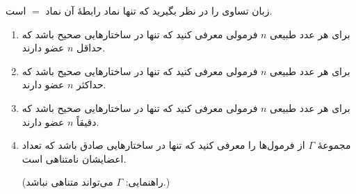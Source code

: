 زبان تساوی را در نظر بگیرید که تنها نماد رابطهٔ آن نماد
$=$
است.
\begin{enumerate}[label=(\alph*)]
    \item برای هر عدد طبیعی 
    $n$
    فرمولی معرفی کنید که تنها در ساختارهایی صحیح باشد که حداقل $n$ عضو دارند.
    \item برای هر عدد طبیعی 
    $n$
    فرمولی معرفی کنید که تنها در ساختارهایی صحیح باشد که حداکثر $n$ عضو دارند.
    \item برای هر عدد طبیعی
    $n$
    فرمولی معرفی کنید که تنها در ساختارهایی صحیح باشد که دقیقاً $n$ عضو دارند.
    \item مجموعهٔ $\Gamma$ از فرمول‌ها را معرفی کنید که تنها در ساختارهایی صادق باشد که تعداد اعضایشان نامتناهی است.
    
    (راهنمایی: $\Gamma$ می‌تواند متناهی نباشد.)
\end{enumerate}